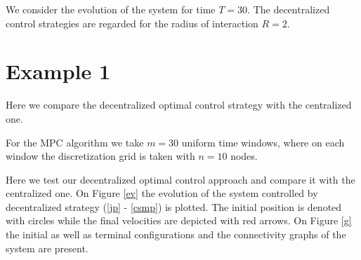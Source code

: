 \documentclass[a4paper,10pt, english]{article}
\begin{document}
We consider the evolution of the system for time $T = 30$. The decentralized control strategies are regarded for the radius of interaction $R = 2$.  
 \section{Example 1}
 Here we compare the decentralized optimal control strategy with the centralized one. 
 
For the MPC algorithm we take  $m = 30$ uniform time windows, where  on each window the discretization grid
is taken with $n = 10$ nodes.  

Here we test our decentralized optimal control approach and compare it with the centralized one. 
On Figure \ref{ev} the evolution of the system  controlled by decentralized strategy (\ref{jp} - \ref{csmp}) is plotted. The initial position
is denoted with circles while the final velocities are depicted with red arrows. On Figure \ref{g} the initial as well as terminal configurations and the connectivity graphs of the system are present.
\end{document}
